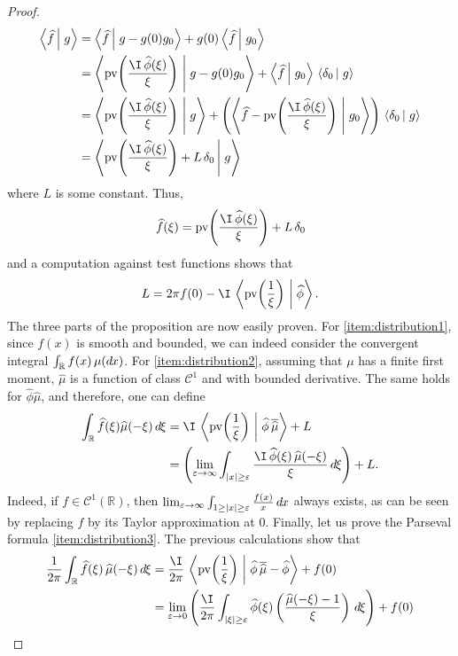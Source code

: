 \documentclass[envcountsame]{svmult}
\newcommand{\R}{\mathbb{R}}
\newcommand{\eps}{\varepsilon}
\newcommand{\scal}[2]{\left\langle #1\vphantom{#2}\,\right |\left.#2 \vphantom{#1}\right\rangle}
\newcommand{\DD}[1]{\,d\hspace*{-0.3mm}{#1}}
\begin{document}
\begin{proof}
\begin{align*}
\scal{\widehat{f}}{g} &= \scal{\widehat{f}}{g-g(0)g_0} + g(0)\scal{\widehat{f}}{g_0} \\
&= \scal{\mathrm{pv}\!\left(\frac{\I\,\widehat{\phi}(\xi)}{\xi}\right)}{g-g(0)g_0} + \scal{\widehat{f}}{g_0}\,\scal{\delta_0}{g} \\
&= \scal{\mathrm{pv}\!\left(\frac{\I\,\widehat{\phi}(\xi)}{\xi}\right)}{g} + \left(\scal{\widehat{f}-\mathrm{pv}\!\left(\frac{\I\,\widehat{\phi}(\xi)}{\xi}\right)}{g_0}\right)\,\scal{\delta_0}{g}\\
&=\scal{\mathrm{pv}\!\left(\frac{\I\,\widehat{\phi}(\xi)}{\xi}\right)+ L\,\delta_0}{g} 
\end{align*}
where $L$ is some constant. Thus,
$$\widehat{f}(\xi) = \mathrm{pv}\!\left(\frac{\I\,\widehat{\phi}(\xi)}{\xi}\right)+ L\,\delta_0$$
and a computation against test functions shows that 
$$L = 2\pi f(0) - \I\,\scal{\mathrm{pv}\!\left(\frac{1}{\xi}\right)}{\widehat{\phi}}.$$
The three parts of the proposition are now easily proven. For \ref{item:distribution1}, since $f(x)$ is smooth and bounded, we can indeed consider the convergent integral $\int_{\R} f(x)\,\mu(\!\DD{x})$. For  \ref{item:distribution2}, assuming that $\mu$ has a finite first moment, $\widehat{\mu}$ is a function of class $\mathscr{C}^1$ and with bounded derivative. The same holds for $\widehat{\phi}\widehat{\mu}$, and therefore, one can define
\begin{align*}
\int_{\R}\widehat{f}(\xi) \widehat{\mu}(-\xi) \DD{\xi} &= \I \,\scal{\mathrm{pv}\!\left(\frac{1}{\xi}\right)}{\widehat{\phi}\,\overline{\widehat{\mu}}} + L \\
&= \left(\lim_{\eps\to \infty}\int_{|x|\geq \eps} \frac{\I\,\widehat{\phi}(\xi)\,\widehat{\mu}(-\xi)}{\xi}\DD{\xi} \right)+L.
\end{align*}
Indeed, if $f \in \mathscr{C}^1(\R)$, then $\lim_{\eps \to \infty} \int_{1\geq |x|\geq \eps} \frac{f(x)}{x}\DD{x}$ always exists, as can be seen by replacing $f$ by its Taylor approximation at $0$. 
Finally, let us prove the Parseval formula \ref{item:distribution3}. The previous calculations show that
\begin{align*}
\frac{1}{2\pi}\int_{\R} \widehat{f}(\xi)\,\widehat{\mu}(-\xi)\DD{\xi} &=  \frac{\I}{2\pi} \,\scal{\mathrm{pv}\!\left(\frac{1}{\xi}\right)}{\widehat{\phi}\,\overline{\widehat{\mu}}-\widehat{\phi} } + f(0) \\
&=\lim_{\eps \to 0} \left(\frac{\I}{2\pi}\int_{|\xi|\geq \eps} \widehat{\phi}(\xi)\left(\frac{\widehat{\mu}(-\xi)-1}{\xi}\right)\DD{\xi}\right) + f(0) \\

\end{align*}
\end{proof}
\end{document}
